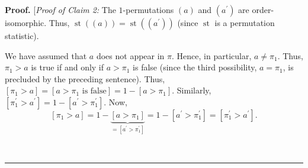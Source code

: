 \documentclass[numbers=enddot,12pt,final,onecolumn,notitlepage]{scrartcl}%
\theoremstyle{definition}
\newenvironment{proof}[1][Proof]{\noindent\textbf{#1.} }{\ \rule{0.5em}{0.5em}}
\newenvironment{verlong}{}{}
\begin{document}
\begin{verlong}
\begin{proof}
[\textit{Proof of Claim 2:} The $1$-permutations $\left(  a\right)  $ and
$\left(  a^{\prime}\right)  $ are order-isomorphic. Thus, $\operatorname{st}
\left(  \left(  a\right)  \right)  =\operatorname{st}\left(  \left(
a^{\prime}\right)  \right)  $ (since $\operatorname{st}$ is a permutation
statistic).

We have assumed that $a$ does not appear in $\pi$. Hence, in
particular, $a \neq \pi_1$. Thus, $\pi_1>a$ is true if and only if
$a>\pi_1$ is false (since the third possibility, $a = \pi_1$,
is precluded by the preceding sentence).
Thus, $\left[\pi_1>a\right] = \left[a>\pi_1 \text{ is false}\right]
= 1 - \left[a>\pi_1\right]$.
Similarly, $\left[\pi^\prime_1>a^\prime\right]
= 1 - \left[a^\prime>\pi^\prime_1\right]$.
Now,
\[
\left[\pi_1>a\right]
= 1 - \underbrace{\left[  a>\pi_{1}\right]}_{= \left[  a^{\prime}>\pi_{1}^{\prime}\right]}
= 1 - \left[  a^{\prime}>\pi_{1}^{\prime}\right]
= \left[\pi^\prime_1>a^\prime\right].
\]


\end{proof}
\end{verlong}
\end{document}
